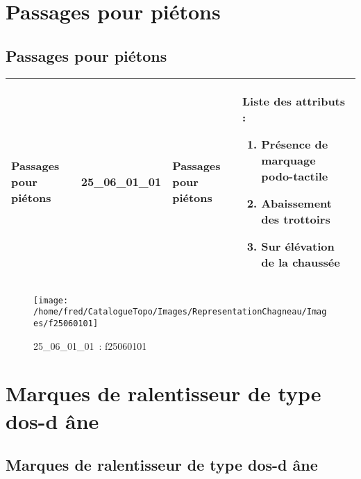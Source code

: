 \documentclass[12pt,titlepage]{book}
\begin{document}
\section{\large Passages pour piétons}
\subsection{Passages pour piétons}
\noindent
\vspace{\baselineskip}

\renewcommand{\arraystretch}{1.2}
\begin{supertabular}{|p{10cm}|c|p{13cm}|p{12cm}|}
 Passages pour piétons & 25\_06\_01\_01 & Passages pour piétons & Liste des attributs :
\begin{enumerate}
  \item Présence de marquage podo-tactile  \item Abaissement des trottoirs  \item Sur élévation de la chaussée\end{enumerate}
\\
\hline
\end{supertabular}
\begin{figure}[h!]
  \hfill         %
  \begin{minipage}[t]{3cm}
    \begin{center}
      \texttt{[image: /home/fred/CatalogueTopo/Images/RepresentationChagneau/Images/f25060101]}
      \caption[~25\_06\_01\_01]{\small{25\_06\_01\_01~:} \tiny{f25060101}}\label{f25060101}
    \end{center}
  \end{minipage}
\end{figure}

\section{\large Marques de ralentisseur de type dos-d âne}
\subsection{Marques de ralentisseur de type dos-d âne}
\noindent
\vspace{\baselineskip}
\end{document}
